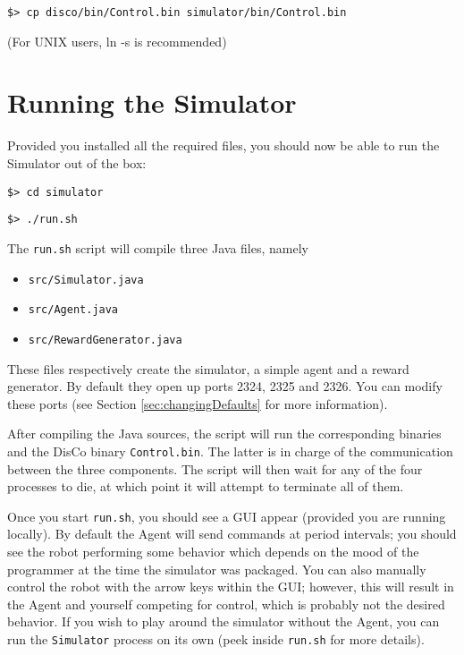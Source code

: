 \documentclass[12pt]{article}
\begin{document}
\begin{verbatim}$> cp disco/bin/Control.bin simulator/bin/Control.bin \end{verbatim}

(For UNIX users, ln -s is recommended)

\section{Running the Simulator}

Provided you installed all the required files, you should now be able to
run the Simulator out of the box:

\begin{verbatim}$> cd simulator \end{verbatim}
\begin{verbatim}$> ./run.sh \end{verbatim}

The \verb+run.sh+ script will compile three Java files, namely

\begin{itemize}
\item{\verb+src/Simulator.java+}
\item{\verb+src/Agent.java+}
\item{\verb+src/RewardGenerator.java+}
\end{itemize}

These files respectively create the simulator, a simple agent and a reward
generator. By default they open up ports 2324, 2325 and 2326. You can modify
these ports (see Section \ref{sec:changingDefaults} for more information).

After compiling the Java sources, the script will run the corresponding
binaries and the DisCo binary \verb+Control.bin+. The latter is in charge
of the communication between the three components. The script will then wait
for any of the four processes to die, at which point it will attempt to 
terminate all of them.

Once you start \verb+run.sh+, you should see a GUI appear (provided you are
running locally). By default the Agent will send commands at period intervals;
you should see the robot performing some behavior which depends on the mood
of the programmer at the time the simulator was packaged. You can also
manually control the robot with the arrow keys within the GUI; however, this
will result in the Agent and yourself competing for control, which is probably
not the desired behavior. If you wish to play around the simulator without
the Agent, you can run the \verb+Simulator+ process on its own (peek inside
\verb+run.sh+ for more details).

\end{document}
